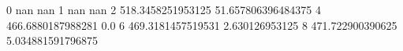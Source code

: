 0 nan nan
1 nan nan
2 518.3458251953125 51.657806396484375
4 466.6880187988281 0.0
6 469.3181457519531 2.630126953125
8 471.722900390625 5.034881591796875
